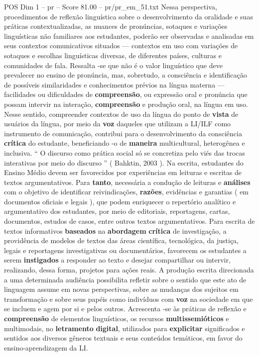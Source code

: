\begin{textsample}{POS Dim 1 – pr – Score 81.00 – pr/pr\_em\_51.txt}
Nessa perspectiva, procedimentos de reflexão linguística sobre o desenvolvimento da oralidade e suas práticas contextualizadas, as nuances de pronúncias, sotaques e variações linguísticas não familiares aos estudantes, poderão ser observadas e analisadas em seus contextos comunicativos situados — contextos em uso com variações de sotaques e escolhas linguísticas diversas, de diferentes países, culturas e comunidades de fala.
Ressalta -se que não é o valor linguístico que deve prevalecer no ensino de pronúncia, mas, sobretudo, a consciência e identificação de possíveis similaridades e conhecimentos prévios na língua materna — facilidades ou dificuldades de \textbf{compreensão}, ou expressão oral e pronúncia que possam intervir na interação, \textbf{compreensão} e produção oral, na língua em uso.
Nesse sentido, compreender contextos de uso da língua do ponto de \textbf{vista} de usuários da língua, por meio da \textbf{voz} daqueles que utilizam a LI/ILF como instrumento de comunicação, contribui para o desenvolvimento da consciência \textbf{crítica} do estudante, beneficiando -o de \textbf{maneira} multicultural, heterogênea e inclusiva. “ O discurso como prática social só se concretiza pelo viés das trocas interativas por meio do discurso ” ( Bahktin, 2003 ).
Na escrita, estudantes do Ensino Médio devem ser favorecidos por experiências em leituras e escritas de textos argumentativos.
Para \textbf{tanto}, necessária a condução de leituras e \textbf{análises} com o objetivo de identificar reivindicações, \textbf{razões}, evidências e garantias ( em documentos oficiais e legais ), que podem enriquecer o repertório analítico e argumentativo dos estudantes, por meio de editoriais, reportagens, cartas, documentos, estudos de casos, entre outros textos argumentativos.
Para escrita de textos informativos \textbf{baseados} na \textbf{abordagem} \textbf{crítica} de investigação, a providência de modelos de textos das áreas científica, tecnológica, da justiça, legais e reportagens investigativas ou documentários, favorecem os estudantes a serem \textbf{instigados} a responder ao texto e desejar compartilhar ou intervir, realizando, dessa forma, projetos para ações reais.
A produção escrita direcionada a uma determinada audiência possibilita refletir sobre o sentido que este ato de linguagem assume em novas perspectivas, sobre as mudanças dos sujeitos em transformação e sobre seus papéis como indivíduos com \textbf{voz} na sociedade em que se incluem e agem por si e pelos outros.
Acrescenta -se às práticas de reflexão e \textbf{compreensão} de elementos linguísticos, os recursos \textbf{multissemióticos} e multimodais, no \textbf{letramento} \textbf{digital}, utilizados para \textbf{explicitar} significados e sentidos aos diversos gêneros textuais e seus conteúdos temáticos, em favor do ensino-aprendizagem da LI.

\end{textsample}
